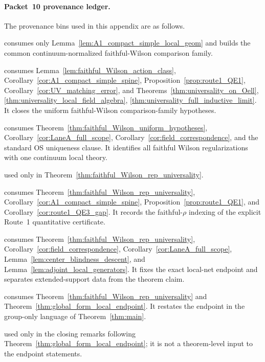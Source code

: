\paragraph{Packet~10 provenance ledger.}
The provenance bins used in this appendix are as follows.
\begin{description}[leftmargin=2.2em,style=nextline]
\item[Lemma~\ref{lem:faithful_Wilson_action_class} (new auxiliary lemma):] consumes only Lemma~\ref{lem:A1_compact_simple_local_geom} and builds the common continuum-normalized faithful-Wilson comparison family.
\item[Theorem~\ref{thm:faithful_Wilson_uniform_hypotheses} (new endpoint):] consumes Lemma~\ref{lem:faithful_Wilson_action_class}, Corollary~\ref{cor:A1_compact_simple_spine}, Proposition~\ref{prop:route1_QE1}, Corollary~\ref{cor:UV_matching_error}, and Theorems~\ref{thm:universality_on_Oell}, \ref{thm:universality_local_field_algebra}, \ref{thm:universality_full_inductive_limit}. It closes the uniform faithful-Wilson comparison-family hypotheses.
\item[Theorem~\ref{thm:faithful_Wilson_rep_universality} (new endpoint):] consumes Theorem~\ref{thm:faithful_Wilson_uniform_hypotheses}, Corollary~\ref{cor:LaneA_full_scope}, Corollary~\ref{cor:field_correspondence}, and the standard OS uniqueness clause. It identifies all faithful Wilson regularizations with one continuum local theory.
\item[Standard OS uniqueness clause~\cite{OS1,OS2} (imported background):] used only in Theorem~\ref{thm:faithful_Wilson_rep_universality}.
\item[Corollary~\ref{cor:faithful_rho_gap_ledger} (new reformulation):] consumes Theorem~\ref{thm:faithful_Wilson_rep_universality}, Corollary~\ref{cor:A1_compact_simple_spine}, Proposition~\ref{prop:route1_QE1}, and Corollary~\ref{cor:route1_QE3_gap}. It records the faithful-$\rho$ indexing of the explicit Route~1 quantitative certificate.
\item[Theorem~\ref{thm:global_form_local_endpoint} (new endpoint):] consumes Theorem~\ref{thm:faithful_Wilson_rep_universality}, Corollary~\ref{cor:field_correspondence}, Corollary~\ref{cor:LaneA_full_scope}, Lemma~\ref{lem:center_blindness_descent}, and Lemma~\ref{lem:adjoint_local_generators}. It fixes the exact local-net endpoint and separates extended-support data from the theorem claim.
\item[Corollary~\ref{cor:global_form_main_scope} (new reformulation):] consumes Theorem~\ref{thm:faithful_Wilson_rep_universality} and Theorem~\ref{thm:global_form_local_endpoint}. It restates the endpoint in the group-only language of Theorem~\ref{thm:main}.
\item[Standard AQFT sector interpretation~\cite{DHR1,DHR2,DoplicherRoberts1990} (imported background):] used only in the closing remarks following Theorem~\ref{thm:global_form_local_endpoint}; it is not a theorem-level input to the endpoint statements.
\end{description}


